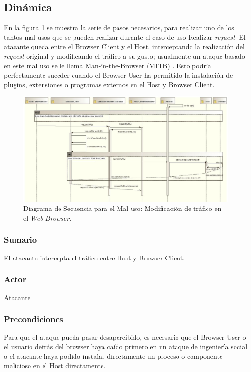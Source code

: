 \subsection{Dinámica}
En la figura \ref{fig:SeqMisuse} se muestra la serie de pasos necesarios, para realizar uno de los tantos mal usos que se pueden realizar durante el caso de uso Realizar \textit{request}. El atacante queda entre el Browser Client y el Host, interceptando la realización del \textit{request} original y modificando el tráfico a su gusto; usualmente un ataque basado en este mal uso se le llama Man-in-the-Browser (MITB) \cite{Liu2012, Barth2010, Utakrit2009, Dougan2012}. Esto podría perfectamente suceder cuando el Browser User ha permitido la instalación de plugins, extensiones o programas externos en el Host y Browser Client.
\begin{landscape}
\begin{figure}[h!t]
	        \centering
	        \includegraphics[scale=0.66]{figures/chap5/patronMisuseSeq_v2.jpg}
	        \caption{Diagrama de Secuencia para el Mal uso: Modificación de tráfico en el \textit{Web Browser}.}
	        \label{fig:SeqMisuse}
    \end{figure}
\end{landscape}
	
	\subsubsection{Sumario} El atacante intercepta el tráfico entre Host y Browser Client.
	\subsubsection{Actor} Atacante
	\subsubsection{Precondiciones} Para que el ataque pueda pasar desapercibido, es necesario que el Browser User o el usuario detrás del browser haya caído primero en un ataque de ingeniería social o el atacante haya podido instalar directamente un proceso o componente malicioso en el Host directamente.
